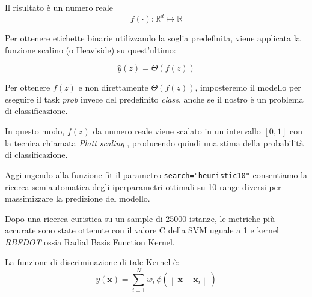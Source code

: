 Il risultato è un numero reale 
$$f(\cdot):\mathbb{R}^d \mapsto \mathbb{R}$$

Per ottenere etichette binarie utilizzando la soglia predefinita, viene applicata la funzione scalino (o Heaviside) su quest'ultimo:

$$\hat{y}(z) = \Theta(f(z))$$

Per ottenere $f(z)$ e non direttamente $\Theta(f(z))$, imposteremo il modello per eseguire il task \textit{prob} invece del predefinito \textit{class}, anche se il nostro è un problema di classificazione.

In questo modo, $f(z)$ da numero reale viene scalato in un intervallo $[0, 1]$ con la tecnica chiamata \textit{Platt scaling} \cite{Platt99probabilisticoutputs}, producendo quindi una stima della probabilità di classificazione.
\par
Aggiungendo alla funzione fit il parametro \texttt{search="heuristic10"} consentiamo la ricerca semiautomatica degli iperparametri ottimali su 10 range diversi per massimizzare la predizione del modello.
\par
Dopo una ricerca euristica su un sample di 25000 istanze, le metriche più accurate sono state ottenute con il valore C della SVM uguale a 1 e kernel \textit{RBFDOT} ossia Radial Basis Function Kernel.
\par
La funzione di discriminazione di tale Kernel è:
\begin{equation}
y\left(\mathbf{x}\right) = \sum_{i=1}^N w_i \, \phi\left(\left\|\mathbf{x} - \mathbf{x}_i\right\|\right)\label{RBFK}
\end{equation}
